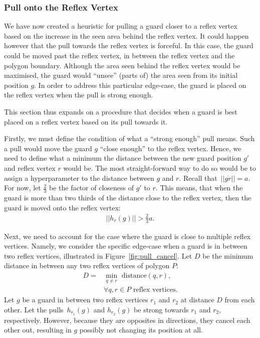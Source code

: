 \subsubsection{Pull onto the Reflex Vertex}
\label{sec:pull_onto}
We have now created a heuristic for pulling a guard closer to a reflex vertex based on the increase in the seen area behind the reflex vertex. It could happen however that the pull towards the reflex vertex is forceful. In this case, the guard could be moved past the reflex vertex, in between the reflex vertex and the polygon boundary. Although the area seen behind the reflex vertex would be maximised, the guard would ``unsee'' (parts of) the area seen from its initial position $g$. In order to address this particular edge-case, the guard is placed on the reflex vertex when the pull is strong enough. 

This section thus expands on a procedure that decides when a guard is best placed on a reflex vertex based on its pull towards it.

Firstly, we must define the condition of what a ``strong enough'' pull means. Such a pull would move the guard $g$ ``close enough'' to the reflex vertex. Hence, we need to define what a minimum the distance between the new guard position $g'$ and reflex vertex $r$ would be. The most straight-forward way to do so would be to assign a hyperparameter to the distance between $g$ and $r$. Recall that~$||\overline{gr}|| = a$. For now, let $\frac 2 3$ be the factor of closeness of $g'$ to $r$. This means, that when the guard is more than two thirds of the distance close to the reflex vertex, then the guard is moved onto the reflex vertex: 
\begin{align}
    ||h_r(g)|| > \frac 2 3 a. \label{eq:h_a}
\end{align}

Next, we need to account for the case where the guard is close to multiple reflex vertices. Namely, we consider the specific edge-case when a guard is in between two reflex vertices, illustrated in Figure~\ref{fig:pull_cancel}. Let $D$ be the minimum distance in between any two reflex vertices of polygon $P$:
\begin{align*}
    D = &\min_{q \neq r} \text{ distance}(q, r), \\
    &\forall q, r \in P \text{ reflex vertices}.
\end{align*}
Let $g$ be a guard in between two reflex vertices $r_1$ and $r_2$ at distance $D$ from each other. Let the pulls~$h_{r_1}(g)$ and $h_{r_2}(g)$ be strong towards $r_1$ and $r_2$, respectively. However, because they are opposites in directions, they cancel each other out, resulting in $g$ possibly not changing its position at all.

